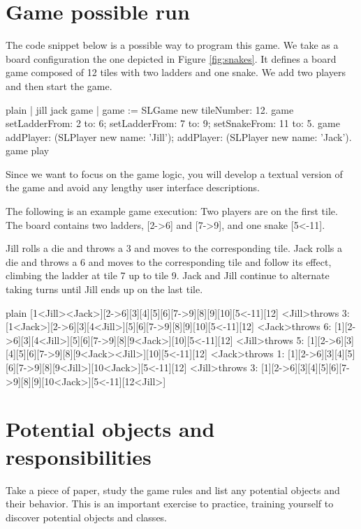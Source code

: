 \documentclass[10pt,twoside,english]{_support/latex/sbabook/sbabook}
\begin{document}
\section{Game possible run}
The code snippet below is a possible way to program this game. We take as a board configuration the one depicted in Figure \ref{fig:snakes}. It defines a board game composed of 12 tiles with two ladders and one snake. We  add two players and then start the game.

\begin{displaycode}{plain}
| jill jack game |
game := SLGame new tileNumber: 12.
game 
	setLadderFrom: 2 to: 6;
	setLadderFrom: 7 to: 9;
	setSnakeFrom: 11 to: 5.
game 
	addPlayer: (SLPlayer new name: 'Jill');
	addPlayer: (SLPlayer new name: 'Jack'). 
game play
\end{displaycode}

Since we want to focus on the game logic, you will develop a textual version of the game and avoid any lengthy user interface descriptions.

The following is an example game execution: Two players are on the first tile. The board contains two ladders, {[}2-\textgreater{}6{]} and {[}7-\textgreater{}9{]}, and one snake {[}5\textless{}-11{]}.

Jill rolls a die and throws a 3 and moves to the corresponding tile.
Jack rolls a die and throws a 6 and moves to the corresponding tile and follow its effect, climbing the ladder at tile 7 up to tile 9.
Jack and Jill continue to alternate taking turns until Jill ends up on the last tile.

\begin{displaycode}{plain}
[1<Jill><Jack>][2->6][3][4][5][6][7->9][8][9][10][5<-11][12]
<Jill>throws 3: [1<Jack>][2->6][3][4<Jill>][5][6][7->9][8][9][10][5<-11][12]
<Jack>throws 6: [1][2->6][3][4<Jill>][5][6][7->9][8][9<Jack>][10][5<-11][12]
<Jill>throws 5: [1][2->6][3][4][5][6][7->9][8][9<Jack><Jill>][10][5<-11][12]
<Jack>throws 1: [1][2->6][3][4][5][6][7->9][8][9<Jill>][10<Jack>][5<-11][12]
<Jill>throws 3: [1][2->6][3][4][5][6][7->9][8][9][10<Jack>][5<-11][12<Jill>]
\end{displaycode}
\section{Potential objects and responsibilities}
Take a piece of paper, study the game rules and list any potential objects and their behavior. This is an important exercise to practice, training yourself to discover potential objects and classes.
\end{document}
